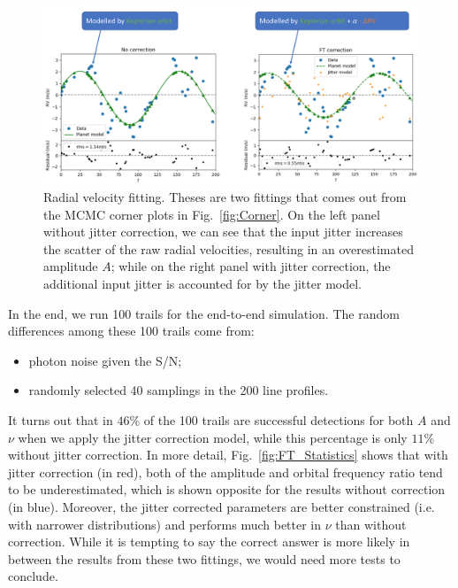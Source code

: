 \begin{figure}[tbp]
\centering
\includegraphics[width = 0.99 \linewidth]
{./Figures/Methods/Fitting.png}
\caption[Planet recovery]
{Radial velocity fitting. Theses are two fittings that comes out from the MCMC corner plots in Fig.~\ref{fig:Corner}. 
On the left panel without jitter correction, we can see that the input jitter increases the scatter of the raw radial 
velocities, resulting in an overestimated amplitude $A$; while on the right panel with jitter correction, the additional 
input jitter is accounted for by the jitter model.}
\label{fig:Planet_recovery}
\end{figure} 

In the end, we run 100 trails for the end-to-end simulation. The random differences among these 100 trails come from:
\begin{itemize}
	\item photon noise given the S/N;
	\item randomly selected 40 samplings in the 200 line profiles.
\end{itemize}
It turns out that in $46\%$ of the 100 trails are successful detections for both $A$ and $\nu$ when we 
apply the jitter correction model, while this percentage is only $11\%$ without jitter correction. 
In more detail, Fig.~\ref{fig:FT_Statistics} shows that with jitter correction (in red), both of the amplitude and 
orbital frequency ratio tend to be underestimated, which is shown opposite for the results without correction (in blue). 
Moreover, the jitter corrected parameters are better constrained (i.e. with narrower distributions) and 
performs much better in $\nu$ than without correction. While it is tempting to say the correct answer is more likely in between
the results from these two fittings, we would need more tests to conclude. 

